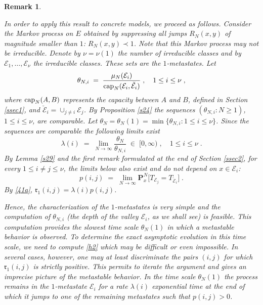 \documentclass[reqno]{amsart}
\newtheorem{remark}[theorem]{Remark}
\begin{document}
\begin{remark}
\label{mr1}
{\rm
In order to apply this result to concrete models, we proceed as
follows. Consider the Markov process on $E$ obtained by suppressing
all jumps $R_N(x,y)$ of magnitude smaller than $1$: $R_N(x,y) \prec
1$. Note that this Markov process may not be irreducible. Denote by
$\nu=\nu(1)$ the number of irreducible classes and by ${{\mathcal E}}_1, \dots,
{{\mathcal E}}_\nu$ the irreducible classes. These sets are the $1$-metastates.
Let 
\begin{equation}
\label{h1}
\theta_{N,i} \;=\; \frac{\mu_N({{\mathcal E}}_i)}
{{{\rm cap}}_N({{\mathcal E}}_i , \breve{{{\mathcal E}}}_i)}\;,\quad 1\le i\le \nu\;,
\end{equation}
where ${{\rm cap}}_N(A,B)$ represents the capacity between $A$ and $B$,
defined in Section \ref{ssec1}, and $\breve{{{\mathcal E}}}_i = \cup_{j\not =i}
{{\mathcal E}}_j$. By Proposition \ref{s24} the sequences $(\theta_{N,i} :N\ge 1)$,
$1\le i\le \nu$, are comparable. Let $\theta_{N} = \theta_N(1) =
\min\{\theta_{N,i}: 1\le i\le \nu\}$. Since the sequences are
comparable the following limits exist
\begin{equation*}
\lambda (i) \;=\;
\lim_{N\to\infty}\frac{\theta_{N}}{\theta_{N,i}}\;\in\;
[0,\infty)\;, \quad 1\le i\le \nu\;. 
\end{equation*}
By Lemma \ref{s29} and the first remark formulated at the end of
Section \ref{ssec2}, for every $1\le i\not = j\le \nu$, the limits
below also exist and do not depend on $x\in {{\mathcal E}}_i$:
\begin{equation}
\label{h2}
p(i,j) \;=\; \lim_{N\to\infty} {{\mathbf P}}^N_x \big[T_{{{\mathcal E}}_j} =
T_{\breve{{{\mathcal E}}}_i} \big]\;. 
\end{equation}
By \eqref{41a}, ${{\mathfrak r}}_1(i,j) = \lambda(i) p(i,j)$.

Hence, the characterization of the $1$-metastates is very simple and
the computation of $\theta_{N,i}$ (the depth of the valley ${{\mathcal E}}_i$,
as we shall see) is feasible. This computation provides the slowest
time scale $\theta_N(1)$ in which a metastable behavior is
observed. To determine the exact asymptotic evolution in this time
scale, we need to compute \eqref{h2} which may be difficult or even
impossible. In several cases, however, one may at least discriminate
the pairs $(i,j)$ for which ${{\mathfrak r}}_1(i,j)$ is strictly positive. This
permits to iterate the argument and gives an imprecise picture of the
metastable behavior. In the time scale $\theta_N(1)$ the process
remains in the $1$-metastate ${{\mathcal E}}_i$ for a rate $\lambda(i)$
exponential time at the end of which it jumps to one of the remaining
metastates such that $p(i,j)>0$.

}
\end{remark}
\end{document}
